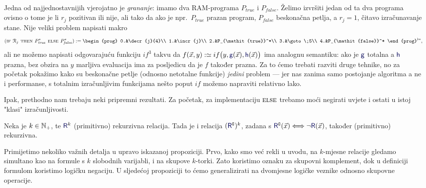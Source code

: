 Jedna od najjednostavnijih vjerojatno je \emph{grananje}: imamo dva RAM-programa $P_{\mathit{true}}$ i $P_{\mathit{false}}$. Želimo izvršiti jedan od ta dva programa ovisno o tome je li $r_j$ pozitivan ili nije, ali tako da ako je npr.\ $P_{\mathit{true}}$ prazan program, $P_{\mathit{false}}$ beskonačna petlja, a $r_j=1$, čitavo izračunavanje stane. Nije veliki problem napisati makro
\begin{equation}
    (\textsc{if $\reg{j}$ then $P_{\mathit{true}}^*$ else $P_{\mathit{false}}^*$}):=\begin{prog}
    0.&\decr{j}{4}\\
    1.&\incr{j}\\
    2.&P_{\mathit{true}}^*\\
    3.&\goto\;5\\
    4.&P_{\mathit{false}}^*
    \end{prog}^{\flat*}\text,
\end{equation}
ali ne možemo napisati odgovarajuću funkciju $if^3$ takvu da $f(\vec x,y):\simeq if\bigl(y,\f g(\vec x),\f h(\vec x)\bigr)$ ima analognu semantiku: ako je $\f g$ totalna a $\f h$ prazna, bez obzira na $y$ marljiva evaluacija ima za posljedicu da je $f$ također prazna. Za to ćemo trebati razviti druge tehnike, no za početak pokažimo kako su beskonačne petlje (odnosno netotalne funkcije) \emph{jedini} problem --- jer nas zanima samo postojanje algoritma a ne i performanse, s totalnim izračunljivim funkcijama nešto poput $if$ možemo napraviti relativno lako. 

Ipak, prethodno nam trebaju neki pripremni rezultati. Za početak, za implementaciju $\textsc{else}$ trebamo moći negirati uvjete i ostati u istoj "klasi" izračunljivosti.

\begin{propozicija}[{name=[komplement čuva (primitivnu) rekurzivnost]}]\label{prop:kompl}
Neka je $k\in{\mathbb N}_+$, te $\f R^k$ (primitivno) rekurzivna relacija. Tada je i relacija $(\f R\kompl)^k$, zadana s $\f R\kompl(\vec x)\Longleftrightarrow\lnot \f R(\vec x)$, također (primitivno) rekurzivna.
\end{propozicija}

Primijetimo nekoliko važnih detalja u upravo iskazanoj propoziciji. Prvo, kako smo već rekli u uvodu, na $k$-mjesne relacije gledamo simultano kao na formule s $k$ slobodnih varijabli, i na skupove $k$-torki. Zato koristimo oznaku za skupovni komplement, dok u definiciji formulom koristimo logičku negaciju. U sljedećoj propoziciji to ćemo generalizirati na dvomjesne logičke veznike odnosno skupovne operacije.

